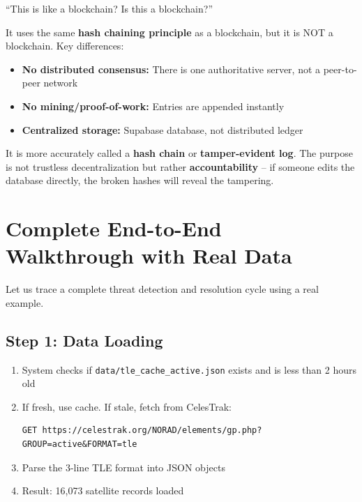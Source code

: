 \documentclass[12pt,a4paper]{article}
\begin{document}
\begin{questionbox}
``This is like a blockchain? Is this a blockchain?''
\end{questionbox}
\begin{answerbox}
It uses the same \textbf{hash chaining principle} as a blockchain, but it is NOT a blockchain. Key differences:
\begin{itemize}
    \item \textbf{No distributed consensus:} There is one authoritative server, not a peer-to-peer network
    \item \textbf{No mining/proof-of-work:} Entries are appended instantly
    \item \textbf{Centralized storage:} Supabase database, not distributed ledger
\end{itemize}
It is more accurately called a \textbf{hash chain} or \textbf{tamper-evident log}. The purpose is not trustless decentralization but rather \textbf{accountability} -- if someone edits the database directly, the broken hashes will reveal the tampering.
\end{answerbox}

\newpage
\section{Complete End-to-End Walkthrough with Real Data}

Let us trace a complete threat detection and resolution cycle using a real example.

\subsection{Step 1: Data Loading}
\begin{enumerate}
    \item System checks if \texttt{data/tle\_cache\_active.json} exists and is less than 2 hours old
    \item If fresh, use cache. If stale, fetch from CelesTrak:
    \begin{lstlisting}[language={}]
GET https://celestrak.org/NORAD/elements/gp.php?GROUP=active&FORMAT=tle
    \end{lstlisting}
    \item Parse the 3-line TLE format into JSON objects
    \item Result: 16,073 satellite records loaded
\end{enumerate}
\end{document}
